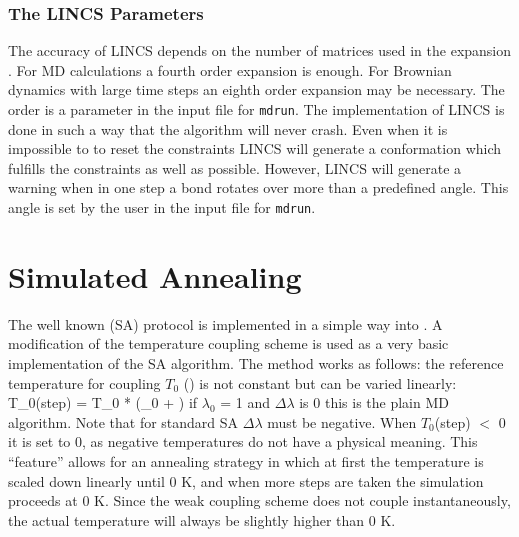 \subsubsection*{The LINCS Parameters}
The accuracy of LINCS depends on the number of matrices used
in the expansion . For MD calculations a fourth order
expansion is enough. For Brownian dynamics with
large time steps an eighth order expansion may be necessary.
The order is a parameter in the input file for \verb'mdrun'.
The implementation of LINCS is done in such a way that the 
algorithm will never crash. Even when it is impossible to
to reset the constraints LINCS will generate a conformation
which fulfills the constraints as well as possible.
However, LINCS will generate a warning when in one step a bond 
rotates over more than a predefined angle.
This angle is set by the user in the input file for \verb'mdrun'.


\section{Simulated Annealing}
\label{sec:SA}
The well known 
(SA) protocol is implemented
in a simple way into {\gromacs}. A modification of the temperature coupling
scheme is used as a very basic implementation of the SA algorithm. The
method works as follows: the reference temperature for coupling $T_0$
()
is not constant but can be varied linearly:
\beq
T_0({\rm step}) = T_0 * (\lambda_0 + \Delta{})
\label{eqn:SA}
\eeq
if $\lambda_0$ = 1 and $\Delta\lambda$ is 0 this is the plain MD
algorithm. Note that for standard SA $\Delta\lambda$  must be negative.
When $T_0$(step) $<$ 0 it is set to 0, as negative temperatures do not have
a physical meaning. This ``feature'' 
allows for an annealing strategy in which
at first the temperature is scaled down linearly until 0 K, 
and when more steps
are taken the simulation proceeds at 0 K. Since the weak coupling scheme
does not couple instantaneously, the actual temperature will
always be slightly higher than 0 K.

\newcommand{\vrond}{\stackrel{\circ}{\ve{r}}}
\newcommand{\rond}{\stackrel{\circ}{r}}
\newcommand{\ruis}{\ve{r}^G}

